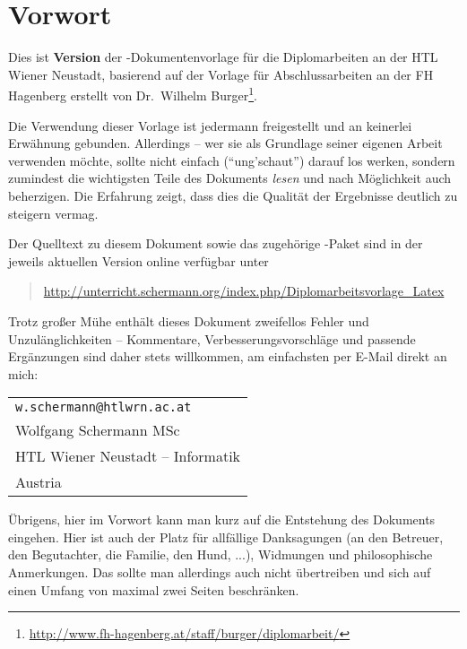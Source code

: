\chapter{Vorwort}

Dies ist \textbf{Version \htldiplDate} der \latex-Dokumentenvorlage für 
die Diplomarbeiten an der HTL Wiener Neustadt, basierend auf der
Vorlage für Abschlussarbeiten an der FH Hagenberg erstellt von Dr.\ Wilhelm
Burger\footnote{\url{http://www.fh-hagenberg.at/staff/burger/diplomarbeit/}}.

Die Verwendung dieser Vorlage ist jedermann freigestellt und an
keinerlei Erwähnung gebunden. Allerdings -- wer sie als Grundlage
seiner eigenen Arbeit verwenden möchte, sollte nicht einfach
("`ung'schaut"') darauf los werken, sondern zumindest die
wichtigsten Teile des Dokuments \emph{lesen} und nach Möglichkeit
auch beherzigen. Die Erfahrung zeigt, dass dies die Qualität der
Ergebnisse deutlich zu steigern vermag.

Der Quelltext zu diesem Dokument sowie das zugehörige
\latex-Paket sind in der jeweils aktuellen Version online
verfügbar unter
%
\begin{quote}
\url{http://unterricht.schermann.org/index.php/Diplomarbeitsvorlage_Latex}
\end{quote}
%
Trotz großer Mühe enthält dieses Dokument zweifellos Fehler und Unzulänglichkeiten
-- Kommentare, Verbesserungsvorschläge und passende Ergänzungen
sind daher stets willkommen, am einfachsten per E-Mail direkt an mich:
\begin{center}%
\begin{tabular}{l}
\nolinkurl{w.schermann@htlwrn.ac.at} \\
Wolfgang Schermann MSc \\
HTL Wiener Neustadt -- Informatik\\
Austria
\end{tabular}
\end{center}

\noindent
Übrigens, hier im Vorwort kann man kurz auf die Entstehung  des Dokuments eingehen.
Hier ist auch der Platz für allfällige Danksagungen (\zB an den Betreuer, 
den Begutachter, die Familie, den Hund, ...), Widmungen und philosophische 
Anmerkungen. Das sollte man allerdings auch nicht übertreiben und sich auf 
einen Umfang von maximal zwei Seiten beschränken.




